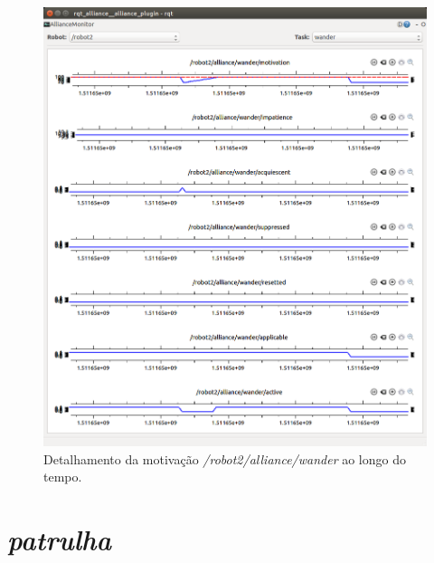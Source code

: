             \begin{figure}
                \centering
                \includegraphics[width=\textwidth]{Figuras/4_resultados/rqt_alliance6.png}
                \caption{Detalhamento da motivação \textit{/robot2/alliance/wander} ao longo do tempo.}
                \label{fig:rqt_alliance_detailed_motivation}
            \end{figure}
        
    \section{\textit{patrulha}}
        
